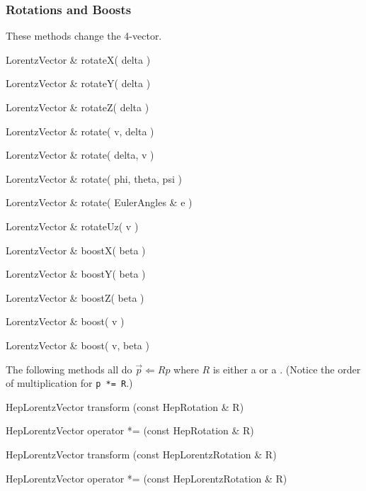 \subsubsection{Rotations and Boosts}

These methods change the 4-vector.

\begin{shortlist}
  \item LorentzVector \& rotateX( delta ) \see{\ref{eq:rotX}}
  \item LorentzVector \& rotateY( delta ) \see{\ref{eq:rotY}}
  \item LorentzVector \& rotateZ( delta ) \see{\ref{eq:rotZ}}
  \item LorentzVector \& rotate( v, delta ) \see{\ref{eq:axisrot}}
  \item LorentzVector \& rotate( delta, v ) \see{\ref{eq:axisrot}}
  \item LorentzVector \& rotate( phi, theta, psi ) \see{\ref{eq:eulerrot}}
  \item LorentzVector \& rotate( EulerAngles \& e ) \see{\ref{eq:eulerrot}}
  \item LorentzVector \& rotateUz( v ) \see{\ref{eq:rotUz}}
  \item LorentzVector \& boostX( beta ) \see{\ref{eq:wbX}}
  \item LorentzVector \& boostY( beta ) \see{\ref{eq:wbY}}
  \item LorentzVector \& boostZ( beta ) \see{\ref{eq:wbZ}}
  \item LorentzVector \& boost( v ) \see{\ref{eq:wboostvec}}
  \item LorentzVector \& boost( v, beta ) \see{\ref{eq:pureboost}}
\end{shortlist}


\noindent 
The following methods all do $\vec{p} \Longleftarrow R p$ where $R$ is
either a \Ro or a \LT .
(Notice the order of multiplication for {\tt p *= R}.)

\begin{shortlist}
  \item HepLorentzVector transform   (const HepRotation \& R) 
		\see{\ref{eq:wopstareq}}
  \item HepLorentzVector operator *= (const HepRotation \& R) 
		\see{\ref{eq:wopstareq}}
  \item HepLorentzVector transform   (const HepLorentzRotation \& R) 
		\see{\ref{eq:wopstareq}}
  \item HepLorentzVector operator *= (const HepLorentzRotation \& R) 
		\see{\ref{eq:wopstareq}}
\end{shortlist}


